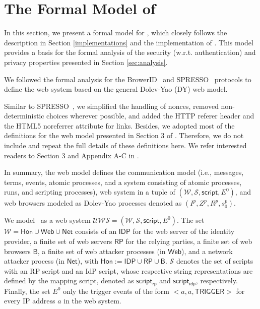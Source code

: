 \appendix

\section{The Formal Model of \usso}
\label{appendix-model}

In this section, we present a formal model for \usso, which closely follows the description in Section \ref{implementations} and the implementation of \usso.
This model provides a basis for the formal analysis of the security (w.r.t. authentication) and privacy properties presented in Section \ref{sec:analysis}.

\vspace{1mm}  We followed the formal analysis for the BrowerID~\cite{BrowserID} and SPRESSO~\cite{SPRESSO} protocols to define the web system based on the general Dolev-Yao (DY) web model. 

Similar to SPRESSO~\cite{SPRESSO}, we simplified the handling of nonces, removed non-deterministic choices wherever possible, and added the HTTP referer header and the HTML5 noreferrer attribute for links.
Besides, we adopted most of the definitions for the web model presented in Section 3 of \cite{SPRESSO}. Therefore, we do not include and repeat the full details of these definitions here. We refer interested readers to Section 3 and Appendix A-C in \cite{SPRESSO}.

In summary, the web model defines the communication model (i.e., messages, terms, events, atomic processes, and a system consisting of atomic processes, runs, and scripting processes), web system in a tuple of $(\mathcal{W}, \mathcal{S}, \mathsf{script}, E^0)$, and web browsers modeled as Dolev-Yao processes denoted as $(I^p, Z^p, R^p, s_0^p)$. 

\vspace{1mm}  We model \usso\ as a web system $\mathcal{U\!W\!S}=(\mathcal{W}, \mathcal{S}, \mathsf{script}, E^0)$. The set $\mathcal{W} = \mathsf{Hon} \cup \mathsf{Web} \cup \mathsf{Net}$ consists of an $\mathsf{IDP}$ for the web server of the identity provider, a finite set of web servers $\mathsf{RP}$ for the relying parties, 
a finite set of web browsers $\mathsf{B}$, %
a finite set of web attacker processes (in $\mathsf{Web}$), and a network attacker process (in $\mathsf{Net}$), with $\mathsf{Hon}:=\mathsf{IDP}\cup\mathsf{RP}\cup\mathsf{B}$. $\mathcal{S}$ denotes the set of scripts with an RP script and an IdP script, whose respective string representations are defined by the mapping script, denoted as $\mathsf{script_{rp}}$ and $\mathsf{script_{idp}}$, respectively. Finally, the set $E^0$ only the trigger events of the form $<a,a,\mathsf{TRIGGER}>$ for every IP address $a$ in the web system.

